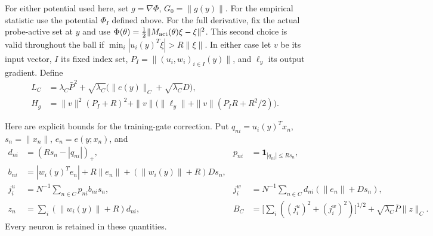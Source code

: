 For either potential used here, set $g=\nabla\Phi$, $G_0=\|g(y)\|$.
For the empirical statistic use the potential $\Phi_I$ defined above. For the full derivative, fix the actual
probe-active set at $y$ and use
$\Phi(\theta)=\frac12\|M_{\rm act}(\theta)\xi-\xi\|^2$.
This second choice is valid throughout the ball if
$\min_i|u_i(y)^T\xi|>R\|\xi\|$.
In either case let $v$ be its input vector, $I$ its fixed index set,
$P_I=\|(u_i,w_i)_{i\in I}(y)\|$, and $\ell_y$ its output gradient.
Define
\begin{align*}
 L_C&=\lambda_C\bar P^2+
 \sqrt{\lambda_C}\big(\|e(y)\|_C+\sqrt{\lambda_C}D\big),\\
 H_g&=\|v\|^2(P_I+R)^2+
 \|v\|\big(\|\ell_y\|+\|v\|(P_IR+R^2/2)\big).
\end{align*}

Here are explicit bounds for the training-gate correction. Put
$q_{ni}=u_i(y)^Tx_n$, $s_n=\|x_n\|$, $e_n=e(y;x_n)$, and
\begin{align*}
 d_{ni}&=(Rs_n-|q_{ni}|)_+,&
 p_{ni}&=\mathbf1_{|q_{ni}|\le Rs_n},\\
 b_{ni}&=|w_i(y)^Te_n|+R\|e_n\|
                 +(\|w_i(y)\|+R)Ds_n,\\
 j_i^u&=N^{-1}\sum_{n\in C}p_{ni}b_{ni}s_n,&
 j_i^w&=N^{-1}\sum_{n\in C}d_{ni}(\|e_n\|+Ds_n),\\
 z_n&=\sum_i(\|w_i(y)\|+R)d_{ni},&
 B_C&=\Big[\sum_i((j_i^u)^2+(j_i^w)^2)\Big]^{1/2}
                  +\sqrt{\lambda_C}\bar P\|z\|_C.
\end{align*}
Every neuron is retained in these quantities.

